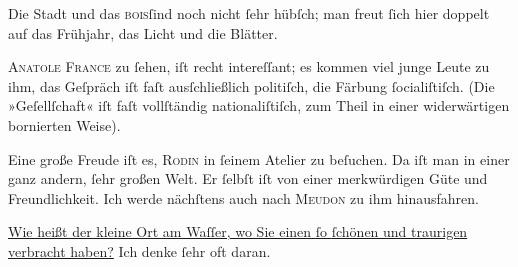 \pstart
           Die Stadt und das \textsc{bois}ſind noch nicht{ }ſehr hübſch; man freut{ }ſich hier
               doppelt auf das Frühjahr, das Licht und die Blätter.\pend
           
\pstart
           \textsc{Anatole France} zu{ }ſehen, iſt recht intereſſant; es kommen {\pb}viel junge Leute zu ihm, das
               Geſpräch iſt faſt ausſchließlich politiſch, die Färbung{ }ſocialiſtiſch. (Die
               »Geſellſchaft« iſt faſt vollſtändig nationaliſtiſch, zum Theil in einer widerwärtigen
               bornierten Weise).\pend
           
\pstart
           Eine große Freude iſt es, \textsc{Rodin} in{ }ſeinem Atelier zu beſuchen. Da iſt man in einer ganz andern,{ }ſehr großen
               Welt. Er{ }ſelbſt iſt von einer merkwürdigen Güte und Freundlichkeit. Ich {\pb}werde  nächſtens auch nach \textsc{Meudon} zu ihm hinausfahren.\pend
           
\pstart
           \uline{Wie heißt der kleine Ort am Waſſer, wo Sie einen{ }ſo{ }ſchönen und traurigen
                     \label{K_L01021-1v}\label{K_L01021-1} verbracht haben?} Ich denke{ }ſehr oft daran.\pend
           

